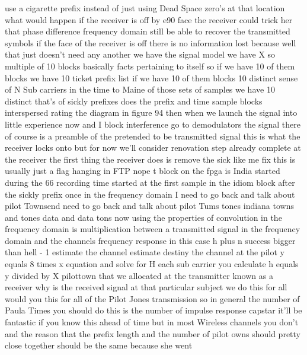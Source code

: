 use a cigarette prefix instead of just using Dead Space zero's at that location what would happen if the receiver is off by e90 face the receiver could trick her that phase difference frequency domain still be able to recover the transmitted symbols if the face of the receiver is off there is no information lost because well that just doesn't need any another we have the signal model we have X so multiple of 10 blocks basically facts pertaining to itself so if we have 10 of them blocks we have 10 ticket prefix list if we have 10 of them blocks 10 distinct sense of N Sub carriers in the time to Maine of those sets of samples we have 10 distinct that's of sickly prefixes does the prefix and time sample blocks interspersed rating the diagram in figure 94 then when we launch the signal into little experience now and I block interference go to demodulators the signal there of course is a preamble of the pretended to be transmitted signal this is what the receiver locks onto but for now we'll consider renovation step already complete at the receiver the first thing the receiver does is remove the sick like me fix this is usually just a flag hanging in FTP nope t block on the fpga is India started during the 66 recording time started at the first sample in the idiom block after the sickly prefix once in the frequency domain I need to go back and talk about pilot Townsend need to go back and talk about pilot Tums tones indiana towns and tones data and data tons now using the properties of convolution in the frequency domain is multiplication between a transmitted signal in the frequency domain and the channels frequency response in this case h plus n success bigger than hell - 1 estimate the channel estimate destiny the channel at the pilot y equals 8 times x equation and solve for H each sub carrier you calculate h equals y divided by X pilottown that we allocated at the transmitter known as a receiver why is the received signal at that particular subject we do this for all would you this for all of the Pilot Jones transmission so in general the number of Paula Times you should do this is the number of impulse response capstar it'll be fantastic if you know this ahead of time but in most Wireless channels you don't and the reason that the prefix length and the number of pilot owns should pretty close together should be the same because she went

